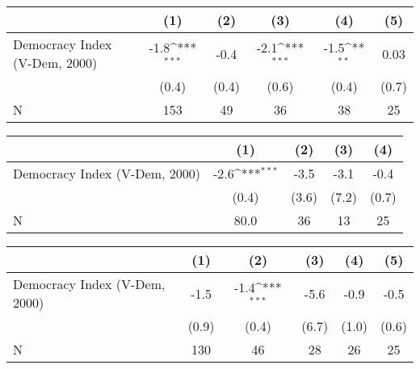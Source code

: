 {
\def\sym#1{\ifmmode^{#1}\else\(^{#1}\)\fi}
\begin{tabular}{l*{5}{c}}
\hline\hline
                    &\multicolumn{1}{c}{(1)}         &\multicolumn{1}{c}{(2)}         &\multicolumn{1}{c}{(3)}         &\multicolumn{1}{c}{(4)}         &\multicolumn{1}{c}{(5)}         \\
\hline
Democracy Index (V-Dem, 2000)&        -1.8\sym{***}&        -0.4         &        -2.1\sym{***}&        -1.5\sym{**} &        0.03         \\
                    &       (0.4)         &       (0.4)         &       (0.6)         &       (0.4)         &       (0.7)         \\
\hline
N                   &         153         &          49         &          36         &          38         &          25         \\
\hline\hline
\end{tabular}
}
{
\def\sym#1{\ifmmode^{#1}\else\(^{#1}\)\fi}
\begin{tabular}{l*{4}{c}}
\hline\hline
                    &\multicolumn{1}{c}{(1)}         &\multicolumn{1}{c}{(2)}         &\multicolumn{1}{c}{(3)}         &\multicolumn{1}{c}{(4)}         \\
\hline
Democracy Index (V-Dem, 2000)&        -2.6\sym{***}&        -3.5         &        -3.1         &        -0.4         \\
                    &       (0.4)         &       (3.6)         &       (7.2)         &       (0.7)         \\
\hline
N                   &        80.0         &          36         &          13         &          25         \\
\hline\hline
\end{tabular}
}
{
\def\sym#1{\ifmmode^{#1}\else\(^{#1}\)\fi}
\begin{tabular}{l*{5}{c}}
\hline\hline
                    &\multicolumn{1}{c}{(1)}         &\multicolumn{1}{c}{(2)}         &\multicolumn{1}{c}{(3)}         &\multicolumn{1}{c}{(4)}         &\multicolumn{1}{c}{(5)}         \\
\hline
Democracy Index (V-Dem, 2000)&        -1.5         &        -1.4\sym{***}&        -5.6         &        -0.9         &        -0.5         \\
                    &       (0.9)         &       (0.4)         &       (6.7)         &       (1.0)         &       (0.6)         \\
\hline
N                   &         130         &          46         &          28         &          26         &          25         \\
\hline\hline
\end{tabular}
}
